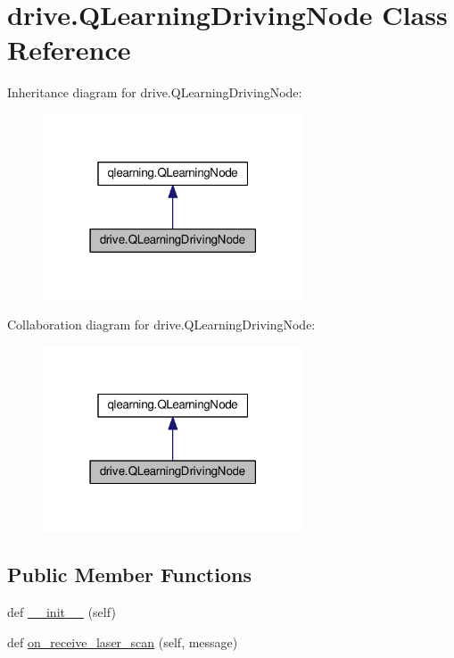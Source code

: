 \hypertarget{classdrive_1_1_q_learning_driving_node}{}\section{drive.\+Q\+Learning\+Driving\+Node Class Reference}
\label{classdrive_1_1_q_learning_driving_node}


Inheritance diagram for drive.\+Q\+Learning\+Driving\+Node\+:
\nopagebreak
\begin{figure}[H]
\begin{center}
\leavevmode
\includegraphics[width=219pt]{classdrive_1_1_q_learning_driving_node__inherit__graph}
\end{center}
\end{figure}


Collaboration diagram for drive.\+Q\+Learning\+Driving\+Node\+:
\nopagebreak
\begin{figure}[H]
\begin{center}
\leavevmode
\includegraphics[width=219pt]{classdrive_1_1_q_learning_driving_node__coll__graph}
\end{center}
\end{figure}
\subsection*{Public Member Functions}
\begin{DoxyCompactItemize}
\item 
def \hyperlink{classdrive_1_1_q_learning_driving_node_ae5291b24979a8decaa85d574a20d7661}{\+\_\+\+\_\+init\+\_\+\+\_\+} (self)
\item 
def \hyperlink{classdrive_1_1_q_learning_driving_node_a2235c596e4d1f3f8d3c535abe2a1af2c}{on\+\_\+receive\+\_\+laser\+\_\+scan} (self, message)
\end{DoxyCompactItemize}
